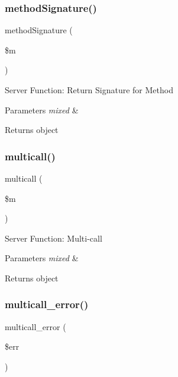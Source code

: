 \subsubsection{\texorpdfstring{method\+Signature()}{methodSignature()}}
{\footnotesize\ttfamily method\+Signature (\begin{DoxyParamCaption}\item[{}]{\$m }\end{DoxyParamCaption})}

Server Function\+: Return Signature for Method


\begin{DoxyParams}{Parameters}
{\em mixed} & \\
\hline
\end{DoxyParams}
\begin{DoxyReturn}{Returns}
object 
\end{DoxyReturn}
\mbox{\label{class_c_i___xmlrpcs_a122ce829a1aa3f0041f922ec5feb95c8}} 
\subsubsection{\texorpdfstring{multicall()}{multicall()}}
{\footnotesize\ttfamily multicall (\begin{DoxyParamCaption}\item[{}]{\$m }\end{DoxyParamCaption})}

Server Function\+: Multi-\/call


\begin{DoxyParams}{Parameters}
{\em mixed} & \\
\hline
\end{DoxyParams}
\begin{DoxyReturn}{Returns}
object 
\end{DoxyReturn}
\mbox{\label{class_c_i___xmlrpcs_a4cf545e6c15e1487b223346b18ca017d}} 
\subsubsection{\texorpdfstring{multicall\+\_\+error()}{multicall\_error()}}
{\footnotesize\ttfamily multicall\+\_\+error (\begin{DoxyParamCaption}\item[{}]{\$err }\end{DoxyParamCaption})}

